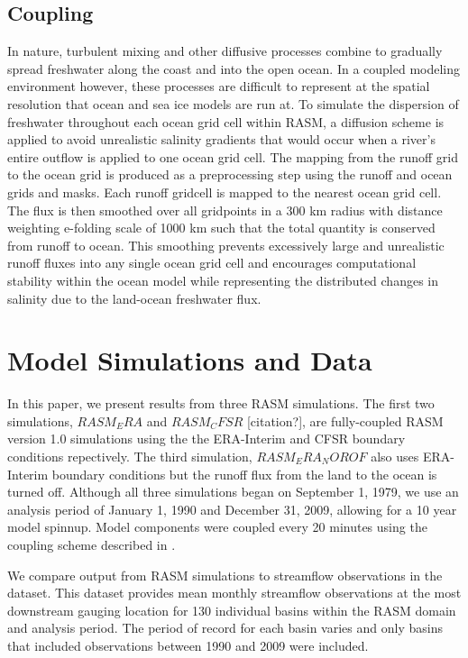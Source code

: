 \documentclass[ms, draft]{agutex}
\begin{document}
\begin{article}
\subsection{Coupling}

In nature, turbulent mixing and other diffusive processes combine to gradually spread freshwater along the coast and into the open ocean.
In a coupled modeling environment however, these processes are difficult to represent at the spatial resolution that ocean and sea ice models are run at.
To simulate the dispersion of freshwater throughout each ocean grid cell within RASM, a diffusion scheme is applied to avoid unrealistic salinity gradients that would occur when a river’s entire outflow is applied to one ocean grid cell.
The mapping from the runoff grid to the ocean grid is produced as a preprocessing step using the runoff and ocean grids and masks.
Each runoff gridcell is mapped to the nearest ocean grid cell.
The flux is then smoothed over all gridpoints in a 300 km radius with distance weighting e-folding scale of 1000 km such that the total quantity is conserved from runoff to ocean.
This smoothing prevents excessively large and unrealistic runoff fluxes into any single ocean grid cell and encourages computational stability within the ocean model while representing the distributed changes in salinity due to the land-ocean freshwater flux.

\section{Model Simulations and Data}

In this paper, we present results from three RASM simulations.
The first two simulations, $RASM_ERA$ \citep{Dee_2011} and $RASM_CFSR$ [citation?], are fully-coupled RASM version 1.0 simulations using the the ERA-Interim and CFSR boundary conditions repectively.
The third simulation, $RASM_ERA_NOROF$ also uses ERA-Interim boundary conditions but the runoff flux from the land to the ocean is turned off.
Although all three simulations began on September 1, 1979, we use an analysis period of January 1, 1990 and December 31, 2009, allowing for a 10 year model spinnup.
Model components were coupled every 20 minutes using the coupling scheme described in \citep{Roberts_2015a}.

We compare output from RASM simulations to streamflow observations in the \citet{Dai_2009} dataset.
This dataset provides mean monthly streamflow observations at the most downstream gauging location for 130 individual basins within the RASM domain and analysis period.
The period of record for each basin varies and only basins that included observations between 1990 and 2009 were included.


\end{article}
\end{document}
